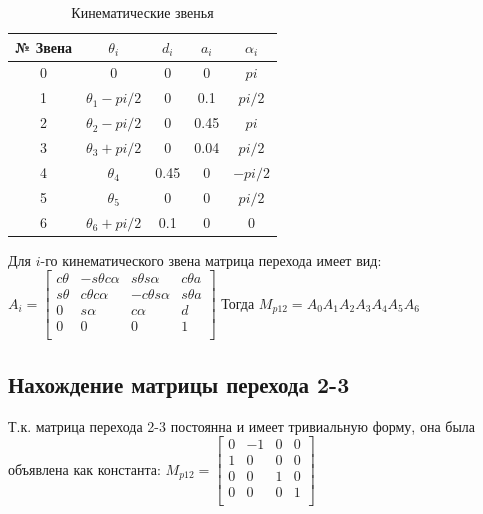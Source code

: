 \documentclass[a4paper,14pt,russian]{extreport} \usepackage{extsizes}
\begin{document}
		\begin{table}[h!]
			\caption{Кинематические звенья} 
			\label{tab_kaw_klass1}
			\centering
			\begin{tabular}{|c|c|c|c|c|}	
				
				\hline № Звена & $\theta_{i}$  & $d_{i}$ & 	$a_{i}$ & $\alpha_{i} $\\
				\hline	0 &  0                  & 0    & 0     & $pi$ \\
				\hline	1 &  $\theta_{1}-pi/2$  & 0    & 0.1   & $pi/2$ \\
				\hline	2 &  $\theta_{2}-pi/2$  & 0    & 0.45  & $pi $ \\
				\hline	3 &  $\theta_{3}+pi/2$  & 0    & 0.04  & $pi/2$  \\
				\hline	4 &  $\theta_{4}$       & 0.45 & 0     & $-pi/2 $  \\
				\hline	5 &  $\theta_{5}$       & 0    & 0     &$ pi/2$ \\ 
				\hline	6 &  $\theta_{6} +pi/2$ & 0.1  & 0      & 0  \\		
				\hline
			\end{tabular} 
		\end{table}
		
		Для $i$-го кинематического звена матрица перехода имеет вид: 
		\newline
		\centering
		$A_{i} =\begin{bmatrix}
		c \theta & -s \theta c \alpha & s \theta s\alpha&   c \theta a\\
		s\theta & c\theta c\alpha & -c\theta s\alpha & s \theta a\\
		0       &    s\alpha   &         c\alpha &             d\\
		0       &    0          &           0    &                  1\\
		\end{bmatrix}$ 
		\flushleft
		Тогда ${M_{p12}}=A_{0}A_{1}A_{2}A_{3}A_{4}A_{5}A_{6}$
		\subsection{Нахождение матрицы перехода 2-3}
		Т.к. матрица перехода 2-3 постоянна и имеет тривиальную форму, она была объявлена как константа:
		${M_{p12}}=\begin{bmatrix}
		0 &-1&0&0\\ 1&0&0&0\\0 &0&1&0\\0&0&0&1\\
		\end{bmatrix}$
\end{document}
